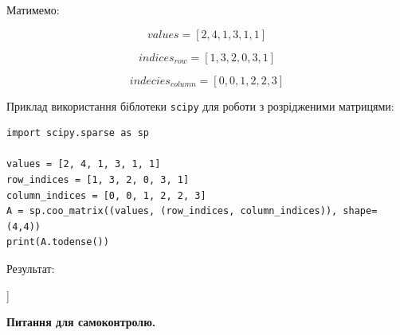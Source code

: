 Матимемо:

$$values = [2, 4, 1, 3, 1, 1]$$

$$indices_{row} = [1, 3, 2, 0, 3, 1]$$

$$indecies_{column} = [0, 0, 1, 2, 2, 3]$$

Приклад використання біблотеки \verb|scipy| для роботи з розрідженими матрицями:

\begin{lstlisting}
import scipy.sparse as sp

values = [2, 4, 1, 3, 1, 1]
row_indices = [1, 3, 2, 0, 3, 1]
column_indices = [0, 0, 1, 2, 2, 3]
A = sp.coo_matrix((values, (row_indices, column_indices)), shape=(4,4))
print(A.todense())
\end{lstlisting}

Результат:

\begin{console}
[[0 0 3 0]
 [2 0 0 1]
 [0 1 0 0]
 [4 0 1 0]]
\end{console}


 \textbf{Питання для самоконтролю.}

